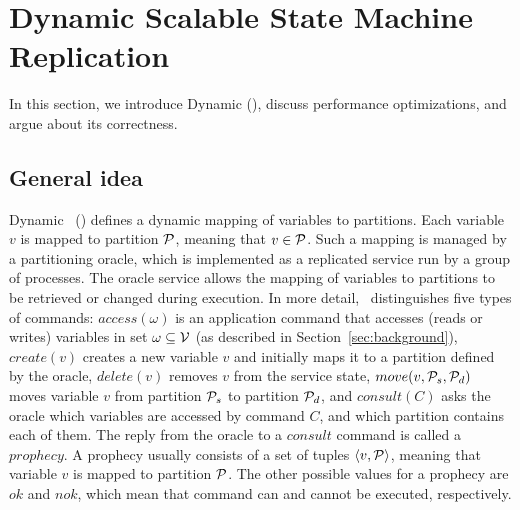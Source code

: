 \section{Dynamic Scalable State Machine Replication}

In this section, we introduce Dynamic \ssmr{} (\dssmr), discuss performance optimizations, and argue about its correctness.

\subsection{General idea}
\label{sec:generalidea}

%

Dynamic \ssmr\ (\dssmr) defines a dynamic mapping of variables to partitions.
Each variable $v$ is mapped to partition $\mathcal{P}$, meaning that $v \in \mathcal{P}$.
Such a mapping is managed by a partitioning oracle, which is implemented as a replicated service run by a group of processes.
The oracle service allows the mapping of variables to partitions to be retrieved or changed during execution.
In more detail, \dssmr\ distinguishes five types of commands:
$access(\omega)$ is an application command that accesses (reads or writes) variables in set $\omega \subseteq \mathcal{V}$ (as described in Section~\ref{sec:background}),
$create(v)$ creates a new variable $v$ and initially maps it to a partition defined by the oracle,
$delete(v)$ removes $v$ from the service state,
$move(v,\mathcal{P}_s,\mathcal{P}_d)$ moves variable $v$ from partition $\mathcal{P}_s$ to partition $\mathcal{P}_d$,
and $consult(C)$ asks the oracle which variables are accessed by command $C$, and which partition contains each of them.
The reply from the oracle to a $consult$ command is called a $prophecy$.
A prophecy usually consists of a set of tuples $\langle v, \mathcal{P} \rangle$, meaning that variable $v$ is mapped to partition $\mathcal{P}$.
The other possible values for a prophecy are $ok$ and $nok$, which mean that command can and cannot be executed, respectively.

